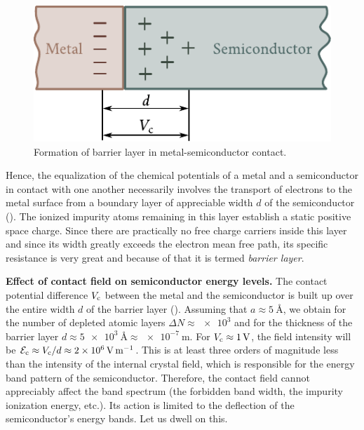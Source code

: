 \begin{figure}[t]
	\begin{center}
		\includegraphics[scale=1]{figures/ch_08/fig_8_6.pdf}
		\caption[]{Formation of barrier layer in metal-semiconductor contact.}
		\label{fig:8_6}
	\end{center}
	\vspace{-0.8cm}
\end{figure}

Hence, the equalization of the chemical potentials of a metal and a semiconductor in contact with one another necessarily involves the transport of electrons to the metal surface from a boundary layer of appreciable width $d$ of the semiconductor (). The ionized impurity atoms remaining in this layer establish a static positive space charge. Since there are practically no free charge carriers inside this layer and since its width greatly exceeds the electron mean free path, its specific resistance is very great and because of that it is termed \textit{barrier layer}.

\textbf{Effect of contact field on semiconductor energy levels.} The contact potential difference $V_{\text{c}}$ between the metal and the semiconductor is built up over the entire width $d$ of the barrier layer (). Assuming that $a\approx\SI{5}{\angstrom}$, we obtain for the number of depleted atomic layers $\Delta{N}\approx\num{e3}$ and for the thickness of the barrier layer $d\approx\SI{5e3}{\angstrom}\approx\SI{e-7}{\metre}$.
For $V_{\text{c}}\approx\SI{1}{\volt}$, the field intensity will be $\mathcal{E}_{\text{c}}\approx V_{\text{c}}/d\approx\SI{2e6}{\volt\per\metre}$. This is at least three orders of magnitude less than the intensity of the internal crystal field, which is responsible for the energy band pattern of the semiconductor. Therefore, the contact field cannot appreciably affect the band spectrum (the forbidden band width, the impurity ionization energy, etc.). Its action is limited to the deflection of the semiconductor's energy bands. Let us dwell on this.

